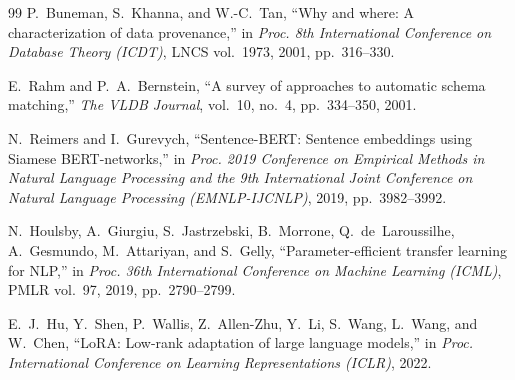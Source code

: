 \documentclass[conference]{IEEEtran}
\begin{document}
\begin{thebibliography}{99}
P.~Buneman, S.~Khanna, and W.-C.~Tan,
``Why and where: A characterization of data provenance,''
in \textit{Proc. 8th International Conference on Database Theory
(ICDT)}, LNCS vol.~1973, 2001, pp.~316--330.

E.~Rahm and P.~A.~Bernstein,
``A survey of approaches to automatic schema matching,''
\textit{The VLDB Journal}, vol.~10, no.~4, pp.~334--350, 2001.

N.~Reimers and I.~Gurevych,
``Sentence-BERT: Sentence embeddings using Siamese BERT-networks,''
in \textit{Proc. 2019 Conference on Empirical Methods in Natural
Language Processing and the 9th International Joint Conference on
Natural Language Processing (EMNLP-IJCNLP)}, 2019, pp.~3982--3992.

N.~Houlsby, A.~Giurgiu, S.~Jastrzebski, B.~Morrone, Q.~de~Laroussilhe,
A.~Gesmundo, M.~Attariyan, and S.~Gelly,
``Parameter-efficient transfer learning for NLP,''
in \textit{Proc. 36th International Conference on Machine Learning
(ICML)}, PMLR vol.~97, 2019, pp.~2790--2799.

E.~J.~Hu, Y.~Shen, P.~Wallis, Z.~Allen-Zhu, Y.~Li,
S.~Wang, L.~Wang, and W.~Chen,
``LoRA: Low-rank adaptation of large language models,''
in \textit{Proc. International Conference on Learning
Representations (ICLR)}, 2022.

\end{thebibliography}
\end{document}
